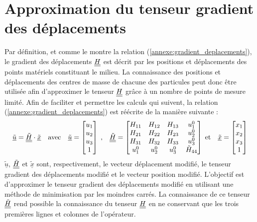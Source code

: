 \section*{Approximation du tenseur gradient des déplacements}
Par définition, et comme le montre la relation (\ref{annexe:gradient_deplacements}), le gradient des déplacements $\underline{\underline{H}}$ est décrit par les positions et déplacements des points matériels constituant le milieu. La connaissance des positions et déplacements des centres de masse de chacune des particules peut donc être utilisée afin d'approximer le tenseur $\underline{\underline{H}}$ grâce à un nombre de points de mesure limité.
Afin de faciliter et permettre les calculs qui suivent, la relation (\ref{annexe:gradient_deplacements}) est réécrite de la manière suivante :
\begin{equation}\label{annexe:gradient_deplacements_bis}
	\underline{\tilde{u}}
	= \underline{\underline{\tilde{H}}} \cdot \underline{\tilde{x}}
	\quad\text{avec}\quad
		\underline{\tilde{u}}
		= \begin{bmatrix}
		u_1\\u_2\\u_3\\1\end{bmatrix}
	\;\text{,}\quad
		\underline{\underline{\tilde{H}}}
		= \begin{bmatrix}
		H_{11} & H_{12} & H_{13} & u_1^0\\
		H_{21} & H_{22} & H_{23} & u_2^0\\
		H_{31} & H_{32} & H_{33} & u_3^0\\
		u_1^0 & u_2^0 & u_3^0 & \tilde{H}_{44}
		\end{bmatrix}
	\;\text{et}\quad
		\underline{\tilde{x}}
		= \begin{bmatrix}
		x_1\\x_2\\x_3\\1\end{bmatrix}
\end{equation}
$\underline{\tilde{u}}$, $\underline{\underline{\tilde{H}}}$ et $\underline{\tilde{x}}$ sont, respectivement, le vecteur déplacement modifié, le tenseur gradient des déplacements modifié et le vecteur position modifié. L'objectif est d'approximer le tenseur gradient des déplacements modifié en utilisant une méthode de minimisation par les moindres carrés. La connaissance de ce tenseur $\underline{\underline{\tilde{H}}}$ rend possible la connaissance du tenseur $\underline{\underline{H}}$ en ne conservant que les trois premières lignes et colonnes de l'opérateur.
